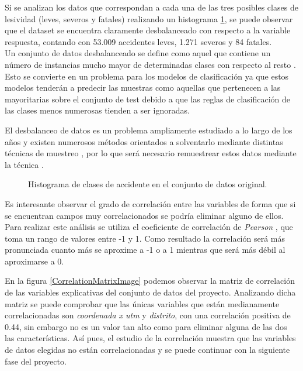 \begin{enumerate}
                    Si se analizan los datos que correspondan a cada una de las tres posibles clases de lesividad (leves, severos y fatales) realizando un histograma \ref{OriginalDataHistogramImage}, se puede observar que el dataset se encuentra claramente desbalanceado con respecto a la variable respuesta, contando con 53.009 accidentes leves, 1.271 severos y 84 fatales.\\

                    Un conjunto de datos desbalanceado se define como aquel que contiene un número de instancias mucho mayor de determinadas clases con respecto al resto \cite{WhyImbalancedDataIsAProblem}. Esto se convierte en un problema para los modelos de clasificación ya que estos modelos tenderán a predecir las muestras como aquellas que pertenecen a las mayoritarias sobre el conjunto de test debido a que las reglas de clasificación de las clases menos numerosas tienden a ser ignoradas.

                    El desbalanceo de datos es un problema ampliamente estudiado a lo largo de los años y existen numerosos métodos orientados a solventarlo mediante distintas técnicas de muestreo \cite{ImbalancedDataReview}, por lo que será necesario remuestrear estos datos mediante la técnica .


                    \begin{figure}[H]
                        \centering
                        
                        \caption{Histograma de clases de accidente en el conjunto de datos original.}
                        \label{OriginalDataHistogramImage}
                     \end{figure}

                    Es interesante observar el grado de correlación entre las variables de forma que si se encuentran campos muy correlacionados se podría eliminar alguno de ellos. Para realizar este análisis se utiliza el coeficiente de correlación de \textit{Pearson} \cite{PearsonCoefficientCorrelationMatrix}, que toma un rango de valores entre -1 y 1. Como resultado la correlación será más pronunciada cuanto más se aproxime a -1 o a 1 mientras que será más débil al aproximarse a 0.

                    En la figura \ref{CorrelationMatrixImage} podemos observar la matriz de correlación de las variables explicativas del conjunto de datos del proyecto. Analizando dicha matriz se puede comprobar que las únicas variables que están medianamente correlacionadas son \textit{coordenada x utm} y \textit{distrito}, con una correlación positiva de 0.44, sin embargo no es un valor tan alto como para eliminar alguna de las dos las características. Así pues, el estudio de la correlación muestra que las variables de datos elegidas no están correlacionadas y se puede continuar con la siguiente fase del proyecto.


\end{enumerate}
